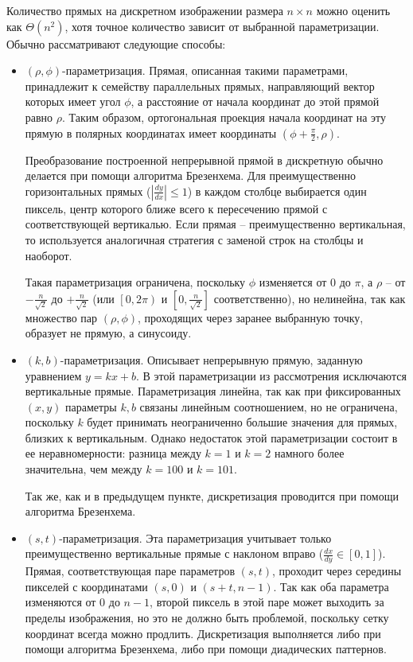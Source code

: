 
Количество прямых на дискретном изображении размера $n \times n$ можно оценить как $\Theta\left( n^2 \right)$, хотя точное количество зависит от выбранной параметризации. Обычно рассматривают следующие способы:
\begin{itemize}
\item
    $\left( \rho, \phi \right)$-параметризация. Прямая, описанная такими параметрами, принадлежит к семейству параллельных прямых, направляющий вектор которых имеет угол $\phi$, а расстояние от начала координат до этой прямой равно $\rho$. Таким образом, ортогональная проекция начала координат на эту прямую в полярных координатах имеет координаты $\left( \phi + \frac{\pi}{2}, \rho \right)$.

    Преобразование построенной непрерывной прямой в дискретную обычно делается при помощи алгоритма Брезенхема. Для преимущественно горизонтальных прямых ($\left|\frac{dy}{dx}\right| \le 1$) в каждом столбце выбирается один пиксель, центр которого ближе всего к пересечению прямой с соответствующей вертикалью. Если прямая -- преимущественно вертикальная, то используется аналогичная стратегия с заменой строк на столбцы и наоборот.

    Такая параметризация ограничена, поскольку $\phi$ изменяется от $0$ до $\pi$, а $\rho$ -- от $-\frac{n}{\sqrt{2}}$ до $+\frac{n}{\sqrt{2}}$ (или $\left[ 0, 2\pi \right)$ и $\left[ 0, \frac{n}{\sqrt{2}} \right]$ соответственно), но нелинейна, так как множество пар $(\rho, \phi)$, проходящих через заранее выбранную точку, образует не прямую, а синусоиду.
\item
    $\left( k, b \right)$-параметризация. Описывает непрерывную прямую, заданную уравнением $y=kx+b$. В этой параметризации из рассмотрения исключаются вертикальные прямые. Параметризация линейна, так как при фиксированных $(x, y)$ параметры $k, b$ связаны линейным соотношением, но не ограничена, поскольку $k$ будет принимать неограниченно большие значения для прямых, близких к вертикальным. Однако недостаток этой параметризации состоит в ее неравномерности: разница между $k=1$ и $k=2$ намного более значительна, чем между $k=100$ и $k=101$.

    Так же, как и в предыдущем пункте, дискретизация проводится при помощи алгоритма Брезенхема.
\item
    $\left( s, t \right)$-параметризация. Эта параметризация учитывает только преимущественно вертикальные прямые с наклоном вправо ($\frac{dx}{dy} \in \left[ 0, 1 \right]$). Прямая, соответствующая паре параметров $(s, t)$, проходит через середины пикселей с координатами $(s, 0)$ и $(s + t, n-1)$. Так как оба параметра изменяются от $0$ до $n-1$, второй пиксель в этой паре может выходить за пределы изображения, но это не должно быть проблемой, поскольку сетку координат всегда можно продлить. Дискретизация выполняется либо при помощи алгоритма Брезенхема, либо при помощи диадических паттернов.


\end{itemize}

